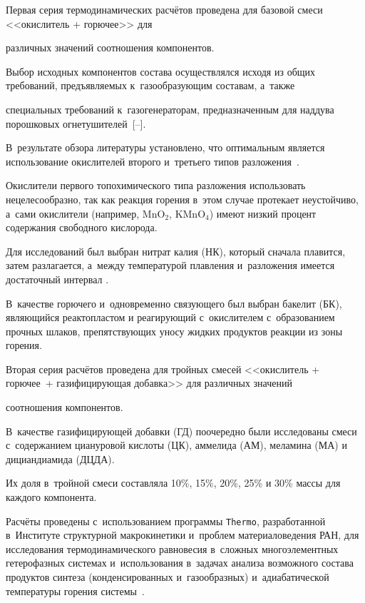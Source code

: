 \smallskip



 Первая серия термодинамических расчётов проведена для базовой смеси <<окислитель + горючее>> для

различных значений соотношения компонентов.



Выбор исходных компонентов состава осуществлялся исходя из общих требований, предъявляемых к~газообразующим составам, а~также

специальных требований к~газогенераторам, предназначенным для наддува порошковых огнетушителей~[--].



В~результате обзора литературы установлено, что оптимальным является использование окислителей второго и~третьего типов разложения~\cite{altuhov:bib4}. 

Окислители первого топохимического типа разложения использовать нецелесообразно, так как реакция горения в~этом случае протекает неустойчиво, а~сами окислители (например, MnO$_2$, KMnO$_4$) имеют низкий процент содержания свободного кислорода. 

Для исследований был выбран нитрат калия (НК), который сначала плавится, затем разлагается, а~между температурой плавления и~разложения имеется достаточный интервал \cite{altuhov:bib4}.



В~качестве горючего и~одновременно связующего был выбран бакелит (БК), являющийся реактопластом и реагирующий с~окислителем с~образованием прочных шлаков, препятствующих уносу жидких продуктов реакции из зоны горения.



Вторая серия расчётов проведена для тройных смесей <<окислитель + горючее~+ газифицирующая добавка>> для различных значений

соотношения компонентов. 

В~качестве газифицирующей добавки (ГД) поочередно были исследованы смеси с~содержанием циануровой кислоты (ЦК), аммелида (АМ), меламина (МА) и дициандиамида (ДЦДА). 

Их доля в~тройной смеси составляла 10{\%}, 15{\%}, 20{\%}, 25{\%} и 30{\%} массы для каждого компонента.



Расчёты проведены с~использованием программы {\tt Thermo}, разработанной в~Институте структурной макрокинетики и~проблем материаловедения РАН, для исследования термодинамического равновесия в~сложных многоэлементных гетерофазных системах и~использования в~задачах анализа возможного состава продуктов синтеза (конденсированных и~газообразных) и~адиабатической температуры горения системы~\cite{altuhov:bib8}. 

